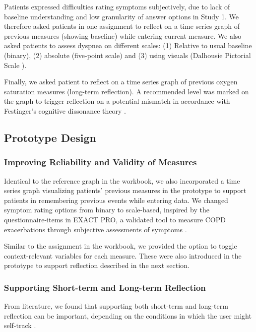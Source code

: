 Patients expressed difficulties rating symptoms subjectively, due to lack of baseline understanding and low granularity of answer options in Study 1. We therefore asked patients in one assignment to reflect on a time series graph of previous measures (showing baseline) while entering current measure. We also asked patients to assess dyspnea on different scales: (1) Relative to usual baseline (binary), (2) absolute (five-point scale) and (3) using visuals (Dalhousie Pictorial Scale \cite{dalhousie}).  

Finally, we asked patient to reflect on a time series graph of previous oxygen saturation measures (long-term reflection). A recommended level was marked on the graph to trigger reflection on a potential mismatch in accordance with Festinger’s cognitive dissonance theory \cite{Rivera}. 

\subsection{Prototype Design}

\subsubsection{Improving Reliability and Validity of Measures}
Identical to the reference graph in the workbook, we also incorporated a time series graph visualizing patients’ previous measures in the prototype to support patients in remembering previous events while entering data. We changed symptom rating options from binary to scale-based, inspired by the questionnaire-items in EXACT PRO, a validated tool to measure COPD exacerbations through subjective assessments of symptoms \cite{exact}. 

Similar to the assignment in the workbook, we provided the option to toggle context-relevant variables for each measure. These were also introduced in the prototype to support reflection described in the next section. 

\subsubsection{Supporting Short-term and Long-term Reflection}
From literature, we found that supporting both short-term and long-term reflection can be important, depending on the conditions in which the user might self-track \cite{Li2010, Muller}. 

